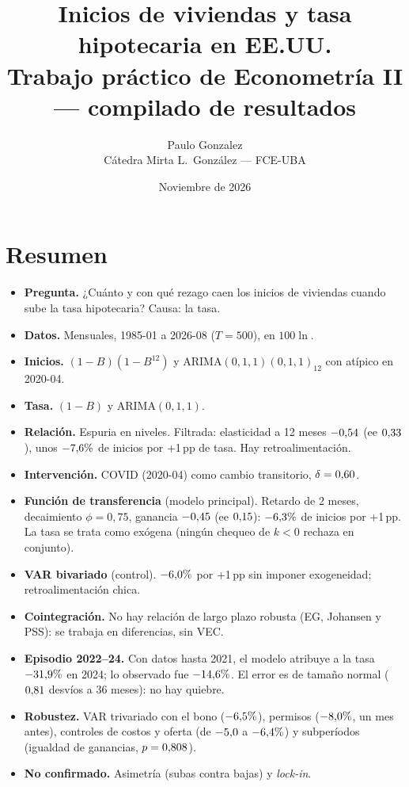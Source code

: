 \documentclass[11pt,a4paper]{article}
\title{\textbf{Inicios de viviendas y tasa hipotecaria en EE.UU.}\\[3pt]
\large Trabajo pr\'actico de Econometr\'ia II --- compilado de resultados}
\author{Paulo Gonzalez\\ \small C\'atedra Mirta L.\ Gonz\'alez --- FCE-UBA}
\date{Noviembre de 2026}
\begin{document}
\sloppy
\maketitle

\section*{Resumen}
\begin{itemize}
\item \textbf{Pregunta.} ¿Cu\'anto y con qu\'e rezago caen los inicios de viviendas cuando sube la tasa hipotecaria? Causa: la tasa.
\item \textbf{Datos.} Mensuales, 1985-01 a 2026-08 ($T=500$), en $100\ln$.
\item \textbf{Inicios.} $(1-B)(1-B^{12})$ y ARIMA$(0,1,1)(0,1,1)_{12}$ con at\'ipico en 2020-04.
\item \textbf{Tasa.} $(1-B)$ y ARIMA$(0,1,1)$.
\item \textbf{Relaci\'on.} Espuria en niveles. Filtrada: elasticidad a 12 meses $-0{,}54$ (ee $0{,}33$), unos $-7{,}6\%$ de inicios por +1\,pp de tasa. Hay retroalimentaci\'on.
\item \textbf{Intervenci\'on.} COVID (2020-04) como cambio transitorio, $\delta=0{,}60$.
\item \textbf{Funci\'on de transferencia} (modelo principal). Retardo de 2 meses, decaimiento $\phi=0{,}75$, ganancia $-0{,}45$ (ee $0{,}15$): $-6{,}3\%$ de inicios por +1\,pp. La tasa se trata como ex\'ogena (ning\'un chequeo de $k<0$ rechaza en conjunto).
\item \textbf{VAR bivariado} (control). $-6{,}0\%$ por +1\,pp sin imponer exogeneidad; retroalimentaci\'on chica.
\item \textbf{Cointegraci\'on.} No hay relaci\'on de largo plazo robusta (EG, Johansen y PSS): se trabaja en diferencias, sin VEC.
\item \textbf{Episodio 2022--24.} Con datos hasta 2021, el modelo atribuye a la tasa $-31{,}9\%$ en 2024; lo observado fue $-14{,}6\%$. El error es de tama\~no normal ($0{,}81$ desv\'ios a 36 meses): no hay quiebre.
\item \textbf{Robustez.} VAR trivariado con el bono ($-6{,}5\%$), permisos ($-8{,}0\%$, un mes antes), controles de costos y oferta (de $-5{,}0$ a $-6{,}4\%$) y subper\'iodos (igualdad de ganancias, $p=0{,}808$).
\item \textbf{No confirmado.} Asimetr\'ia (subas contra bajas) y \emph{lock-in}.
\end{itemize}
\end{document}

